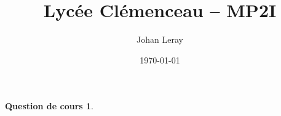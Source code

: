\documentclass[12pt,a4paper]{amsart}
\title{Lycée Clémenceau -- MP2I}
\date{\today}
\author{Johan Leray}
\theoremstyle{definition}
\newtheorem{cours}{Question de cours}
\begin{document}
\thispagestyle{empty}

\section{}
\subsection{}

\begin{cours}
\end{cours}
\end{document}
